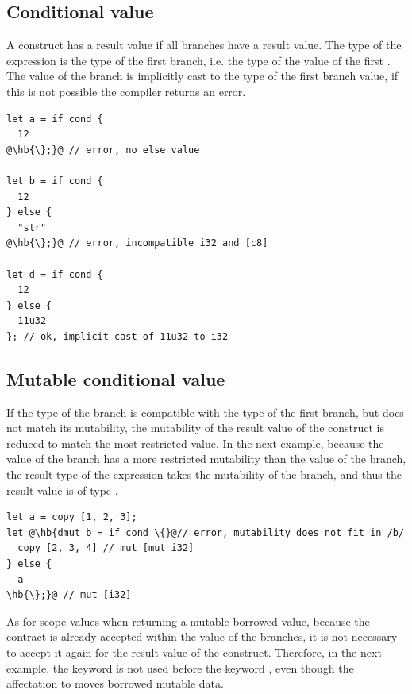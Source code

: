 \subsection {Conditional value}
\label{sec:cond_value_type}

A  construct has a result value if all branches have a result value.
The type of the expression is the type of the first branch, i.e. the type of the
value of the first . The value of the  branch is
implicitly cast to the type of the first branch value, if this is not possible
the compiler returns an error.

\begin{lstlisting}[style=coloredverbatimError, escapechar=@]
let a = if cond {
  12
@\hb{\};}@ // error, no else value

let b = if cond {
  12
} else {
  "str"
@\hb{\};}@ // error, incompatible i32 and [c8]

let d = if cond {
  12
} else {
  11u32
}; // ok, implicit cast of 11u32 to i32
\end{lstlisting}

\subsection{Mutable conditional value}

If the type of the  branch is compatible with the type of the first
branch, but does not match its mutability, the mutability of the result value of
the  construct is reduced to match the most restricted value. In the
next example, because the value of the  branch has a more
restricted mutability than the value of the  branch, the result type
of the expression takes the mutability of the  branch, and thus the
result value is of type .

\begin{lstlisting}[style=coloredverbatimError, escapechar=@]
let a = copy [1, 2, 3];
let @\hb{dmut b = if cond \{}@// error, mutability does not fit in /b/
  copy [2, 3, 4] // mut [mut i32]
} else {
  a
\hb{\};}@ // mut [i32]
\end{lstlisting}

As for scope values when returning a mutable borrowed value, because
the  contract is already accepted within the value of the
branches, it is not necessary to accept it again for the result value of the
 construct. Therefore, in the next example, the keyword
 is not used before the keyword , even though the
affectation to  moves borrowed mutable data.

